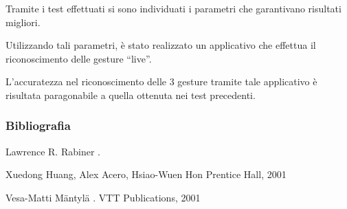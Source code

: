 \documentclass[hyperref={pdfpagelabels=false},slidestop,mathserif,red]{beamer}
\begin{document}
\begin{frame}
 \begin{block}{}
  Tramite i test effettuati si sono individuati i parametri che garantivano risultati migliori.
 \end{block}
 
 \begin{block}{}
  Utilizzando tali parametri, \`e stato realizzato un applicativo che effettua il riconoscimento delle gesture ``live''.
 \end{block}
 
 \begin{block}{}
  L'accuratezza nel riconoscimento delle 3 gesture tramite tale applicativo \`e risultata paragonabile a quella ottenuta nei test precedenti.
 \end{block}

 
\end{frame}


\begin{frame}
	\frametitle{Bibliografia}
	
		\begin{thebibliography}{}
				\footnotesize
				
			 	Lawrence R. Rabiner
				.
				
				Xuedong Huang, Alex Acero, Hsiao-Wuen Hon
				\newblock Prentice Hall, 2001
				
				Vesa-Matti M\"{a}ntyl\"{a} 
				.
				\newblock VTT Publications, 2001


\end{thebibliography}
\end{frame}
\end{document}
